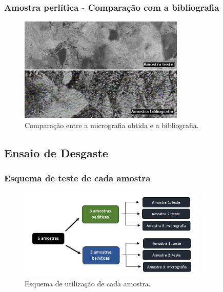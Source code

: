 \documentclass{beamer}
\begin{document}
\begin{frame}
\frametitle{Amostra perlítica - Comparação com a bibliografia}
\begin{figure}
\centering
\includegraphics[width=0.7\textwidth]{comparacao_perlita}
\caption{Comparação entre a micrografia obtida e a bibliografia.}
\label{fig:comparacao_perlita}
\end{figure}
\end{frame}

\subsection{Ensaio de Desgaste}

\begin{frame}
	\frametitle{Esquema de teste de cada amostra}
	
	\begin{figure}
		\centering
		\includegraphics[width=0.8\textwidth]{amostras}
		\caption{Esquema de utilização de cada amostra.}
		\label{fig:amostras}
	\end{figure}
\end{frame}
\end{document}
